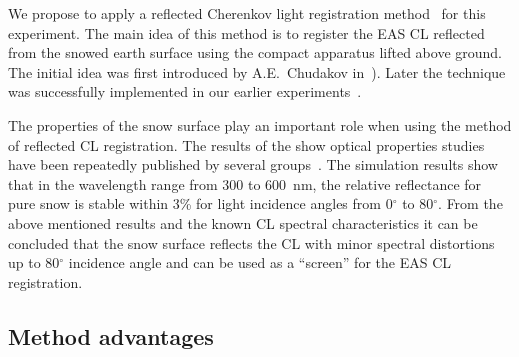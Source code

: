 \documentclass[a4paper,11pt]{article}
\begin{document}
We propose to apply a reflected Cherenkov light registration method~\cite{Ant15a} for this experiment. The main idea of this method is to register the EAS CL reflected from the snowed earth surface using the compact apparatus lifted above ground. The initial idea was first introduced by A.E.~Chudakov in~\cite{Chu74}). Later the technique was successfully implemented in our earlier experiments~\cite{Ant15a, Ant15c}.

The properties of the snow surface play an important role when using the method of reflected CL registration. The results of the show optical properties studies have been repeatedly published by several groups~\cite{qun83, dum10,gre94,war82,hud06}. The simulation results show that in the wavelength range from 300 to 600~nm, the relative reflectance for pure snow is stable within 3\% for light incidence angles from 0$^\circ$ to 80$^\circ$. From the above mentioned results and the known CL spectral characteristics it can be concluded that the snow surface reflects the CL with minor spectral distortions up to 80$^\circ$ incidence angle and can be used as a ``screen'' for the EAS CL registration.

\subsection{Method advantages}
\end{document}
